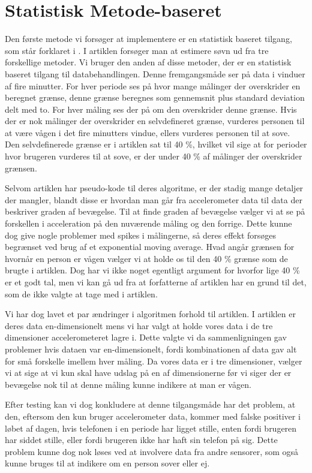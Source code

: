 \section{Statistisk Metode-baseret}\label{sec:statMet}
Den første metode vi forsøger at implementere er en statistisk baseret tilgang, som står forklaret i \citet{gautam2014smartphone}.
I artiklen forsøger man at estimere søvn ud fra tre forskellige metoder.
Vi bruger den anden af disse metoder, der er en statistisk baseret tilgang til databehandlingen.
Denne fremgangsmåde ser på data i vinduer af fire minutter.
For hver periode ses på hvor mange målinger der overskrider en beregnet grænse, denne grænse beregnes som gennemsnit plus standard deviation delt med to.
For hver måling ses der på om den overskrider denne grænse.
Hvis der er nok målinger der overskrider en selvdefineret grænse, vurderes personen til at være vågen i det fire minutters vindue, ellers vurderes personen til at sove.
Den selvdefinerede grænse er i artiklen sat til 40 \%, hvilket vil sige at for perioder hvor brugeren vurderes til at sove, er der under 40 \% af målinger der overskrider grænsen.

Selvom artiklen har pseudo-kode til deres algoritme, er der stadig mange detaljer der mangler, blandt disse er hvordan man går fra accelerometer data til data der beskriver graden af bevægelse.
Til at finde graden af bevægelse vælger vi at se på forskellen i acceleration på den nuværende måling og den forrige.
Dette kunne dog give nogle problemer med spikes i målingerne, så deres effekt forsøges begrænset ved brug af et exponential moving average.
Hvad angår grænsen for hvornår en person er vågen vælger vi at holde os til den 40 \% grænse som de brugte i artiklen.
Dog har vi ikke noget egentligt argument for hvorfor lige 40 \% er et godt tal, men vi kan gå ud fra at forfatterne af artiklen har en grund til det, som de ikke valgte at tage med i artiklen.

Vi har dog lavet et par ændringer i algoritmen forhold til artiklen.
I artiklen er deres data en-dimensionelt mens vi har valgt at holde vores data i de tre dimensioner accelerometeret lagre i.
Dette valgte vi da sammenligningen gav problemer hvis dataen var en-dimensionelt, fordi kombinationen af data gav alt for små forskelle imellem hver måling.
Da vores data er i tre dimensioner, vælger vi at sige at vi kun skal have udslag på en af dimensionerne før vi siger der er bevægelse nok til at denne måling kunne indikere at man er vågen.

Efter testing kan vi dog konkludere at denne tilgangsmåde har det problem, at den, eftersom den kun bruger accelerometer data, kommer med falske positiver i løbet af dagen, hvis telefonen i en periode har ligget stille, enten fordi brugeren har siddet stille, eller fordi brugeren ikke har haft sin telefon på sig.
Dette problem kunne dog nok løses ved at involvere data fra andre sensorer, som også kunne bruges til at indikere om en person sover eller ej. 

